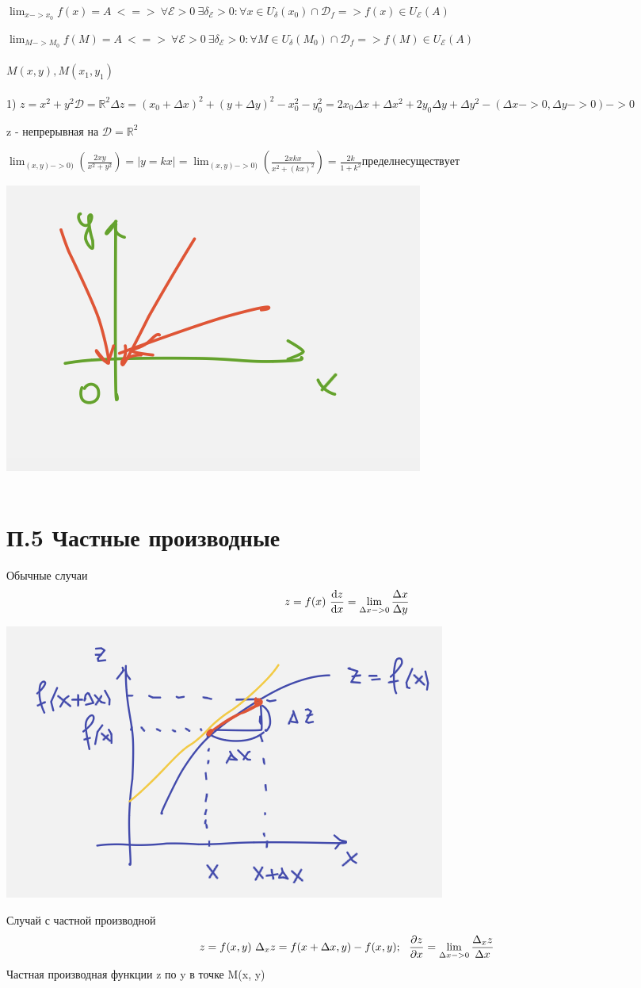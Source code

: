 \documentclass{article}
\begin{document}
$\lim_{x -> x_0}f(x) = A\ <=>\ \forall \mathcal{E} >0 \ \exists \delta_{\mathcal{E}}>0 : \forall x \in U^{\cdot}_{\delta}(x_0) \cap \mathcal{D}_f => f(x) \in U_{\mathcal{E}}(A)$


$\lim_{M -> M_0}f(M) = A\ <=>\ \forall \mathcal{E} >0 \ \exists \delta_{\mathcal{E}}>0 : \forall M \in U^{\cdot}_{\delta}(M_0) \cap \mathcal{D}_f => f(M) \in U_{\mathcal{E}}(A)$
\\ \\
$M(x, y), M(x_1, y_1)$
\\ \\
1) $z = x^2 +y^2 \mathcal{D} = \mathbb{R}^2 \Delta z= (x_0 + \Delta x)^2 + (y+ \Delta y)^2 - x_0^2 - y_0^2 = 2x_0 \Delta x + \Delta x^2 +2y_0\Delta y + \Delta y^2 - (\Delta x ->0,  \Delta y ->0) -> 0 $

z - непрерывная на $\mathcal{D} = \mathbb{R}^2$

$\lim_{(x, y)-> 0)}(\frac{2xy}{x^2 +y^2}) = |y = kx| = \lim_{(x, y)-> 0)}(\frac{2xkx}{x^2 +(kx)^2}) = \frac{2k}{1+k^2} предел не существует
$

\includegraphics[width=.3\textwidth]{lines} 
\\ \\
\section{П.5 Частные производные}

Обычные случаи 
\begin{equation*}
    z = f(x)\ \dv{z}{x}= \lim_{\Delta x-> 0}\frac{\Delta x}{\Delta y}
\end{equation*}
\begin{center}
    \includegraphics[width=.3\textwidth]{f(x).png} 
\end{center}


Случай с частной производной 
\begin{equation*}
    z = f(x, y)\ \Delta_x z = f(x + \Delta x, y) - f(x, y); \ \ \pdv{z}{x} = \lim_{\Delta x-> 0}\frac{\Delta_x z}{\Delta x}
\end{equation*}
Частная производная функции z по y в точке M(x, y)
\end{document}
